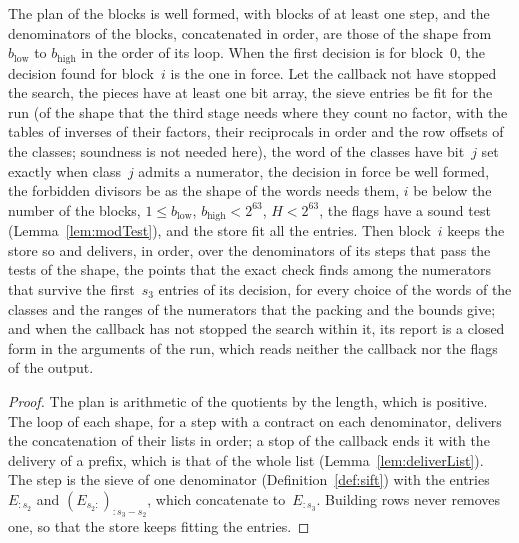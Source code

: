 \begin{lemma}\label{lem:blocks}
  \leanok
  The plan of the blocks is well formed, with blocks of at least one step, and the denominators of
  the blocks, concatenated in order, are those of the shape from $b_{\mathrm{low}}$ to
  $b_{\mathrm{high}}$ in the order of its loop. When the first decision is for block~$0$, the
  decision found for block~$i$ is the one in force. Let the callback not have stopped the search,
  the pieces have at least one bit array, the sieve entries be fit for the run (of the shape that
  the third stage needs where they count no factor, with the tables of inverses of their factors,
  their reciprocals in order and the row offsets of the classes; soundness is not needed here), the
  word of the classes have bit~$j$ set exactly when class~$j$ admits a numerator, the decision in
  force be well formed, the forbidden divisors be as the shape of the words needs them, $i$ be below
  the number of the blocks, $1 \le b_{\mathrm{low}}$, $b_{\mathrm{high}} < 2^{63}$, $H < 2^{63}$,
  the flags have a sound test (Lemma~\ref{lem:modTest}), and the store fit all the entries. Then
  block~$i$ keeps the store so and delivers, in order, over the denominators of its steps that pass
  the tests of the shape, the points that the exact check finds among the numerators that survive
  the first~$s_3$ entries of its decision, for every choice of the words of the classes and the
  ranges of the numerators that the packing and the bounds give; and when the callback has not
  stopped the search within it, its report is a closed form in the arguments of the run, which reads
  neither the callback nor the flags of the output.
\end{lemma}

\begin{proof}
  \leanok
  The plan is arithmetic of the quotients by the length, which is positive. The loop of each shape,
  for a step with a contract on each denominator, delivers the concatenation of their lists in
  order; a stop of the callback ends it with the delivery of a prefix, which is that of the whole
  list (Lemma~\ref{lem:deliverList}). The step is the sieve of one denominator
  (Definition~\ref{def:sift}) with the entries $E_{:s_2}$ and $(E_{s_2:})_{:s_3 - s_2}$, which
  concatenate to~$E_{:s_3}$. Building rows never removes one, so that the store keeps fitting the
  entries.
\end{proof}

